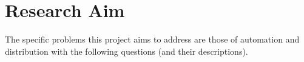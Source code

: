 \documentclass [titlepage,11pt]{article}
\begin{document}

\section{Research Aim}
The specific problems this project aims to address are those of automation and distribution with the following questions (and their descriptions).  \\
\end{document}
